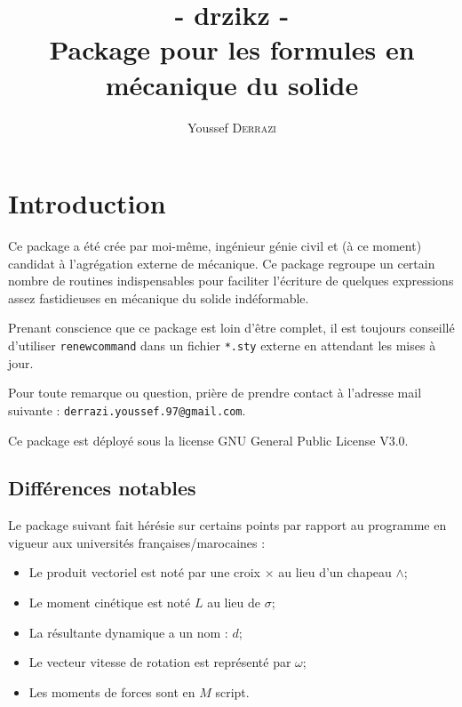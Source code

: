 \documentclass[12pt]{article}
\begin{document}

\title{- drzikz -\\Package pour les formules en mécanique du solide}
\author{Youssef \textsc{Derrazi}}
\maketitle

\tableofcontents
\newpage
{}

\section{Introduction}
Ce package a été crée par moi-même, ingénieur génie civil et (à ce moment) candidat à l'agrégation externe de mécanique. Ce package regroupe un certain nombre de routines indispensables pour faciliter l'écriture de quelques expressions assez fastidieuses en mécanique du solide indéformable.
\vspace{12pt}

Prenant conscience que ce package est loin d'être complet, il est toujours conseillé d'utiliser \verb|renewcommand| dans un fichier \verb|*.sty| externe en attendant les mises à jour.
\vspace{12pt}

Pour toute remarque ou question, prière de prendre contact à l'adresse mail suivante : \verb|derrazi.youssef.97@gmail.com|.
\vspace{12pt}

Ce package est déployé sous la license GNU General Public License V3.0.

\subsection{Différences notables}
Le package suivant fait hérésie sur certains points par rapport au programme en vigueur aux universités françaises/marocaines :

\begin{itemize}
\item Le produit vectoriel est noté par une croix $\times$ au lieu d'un chapeau $\wedge$;
\item Le moment cinétique est noté $L$ au lieu de $\sigma$;
\item La résultante dynamique a un nom : $d$;
\item Le vecteur vitesse de rotation est représenté par $\omega$;
\item Les moments de forces sont en $M$ script.
\end{itemize}
\end{document}
